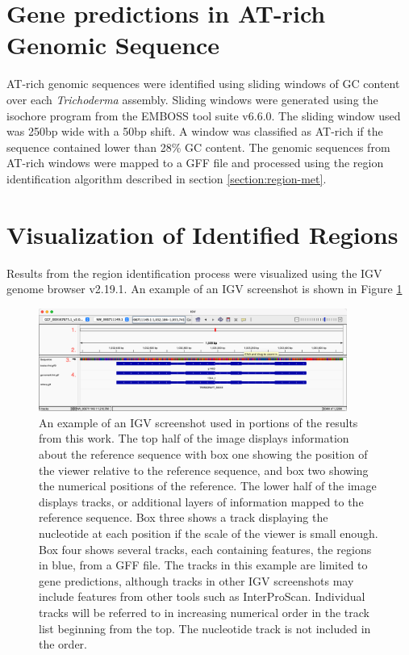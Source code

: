 \section{Gene predictions in AT-rich Genomic Sequence}
\label{met:atrich}
AT-rich genomic sequences were identified using sliding windows of GC
content over each \textit{Trichoderma} assembly. Sliding windows were
generated using the isochore program from the EMBOSS tool suite
v6.6.0\cite{Rice2000}. The sliding window used was 250bp wide with a
50bp shift. A window was classified as AT-rich if the sequence
contained lower than 28\% GC content. The genomic sequences from
AT-rich windows were mapped to a GFF file and processed using the
region identification algorithm described in section
\ref{section:region-met}.

\section{Visualization of Identified Regions}
Results from the region identification process were visualized using
the IGV genome browser v2.19.1\cite{Robinson2011}. An example of an
IGV screenshot is shown in Figure \ref{fig:igv-methods}

\begin{figure}
  \centering
  \includegraphics[width=0.9\textwidth]{figures/igv/igv-agreement-thin-number}
  \caption[IGV example]{An example of an IGV screenshot used in
    portions of the results from this work. The top half of the image
    displays information about the reference sequence with box one
    showing the position of the viewer relative to the reference
    sequence, and box two showing the numerical positions of the
    reference. The lower half of the image displays tracks, or
    additional layers of information mapped to the reference
    sequence. Box three shows a track displaying the nucleotide at
    each position if the scale of the viewer is small enough. Box four
    shows several tracks, each containing features, the regions in
    blue, from a GFF file. The tracks in this example are limited to
    gene predictions, although tracks in other IGV screenshots may
    include features from other tools such as InterProScan. Individual
    tracks will be referred to in increasing numerical order in the
    track list beginning from the top. The nucleotide track is not
    included in the order.}
  \label{fig:igv-methods}
\end{figure}

